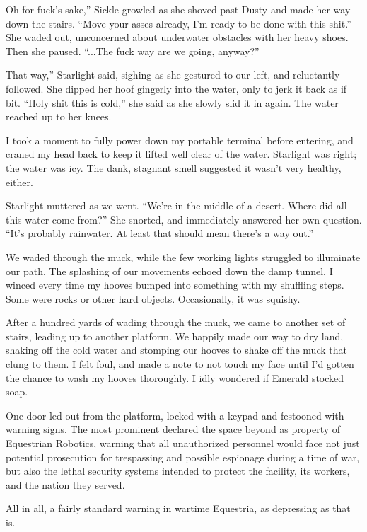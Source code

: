\leavevmode{}Oh for fuck’s sake,” Sickle growled as she shoved past Dusty and made her way down the stairs. “Move your asses already, I’m ready to be done with this shit.” She waded out, unconcerned about underwater obstacles with her heavy shoes. Then she paused. “...The fuck way are we going, anyway?”

\leavevmode{}That way,” Starlight said, sighing as she gestured to our left, and reluctantly followed. She dipped her hoof gingerly into the water, only to jerk it back as if bit. “Holy shit this is cold,” she said as she slowly slid it in again. The water reached up to her knees.

I took a moment to fully power down my portable terminal before entering, and craned my head back to keep it lifted well clear of the water. Starlight was right; the water was icy. The dank, stagnant smell suggested it wasn’t very healthy, either.

Starlight muttered as we went. “We’re in the middle of a desert. Where did all this water come from?” She snorted, and immediately answered her own question. “It’s probably rainwater. At least that should mean there’s a way out.”

We waded through the muck, while the few working lights struggled to illuminate our path. The splashing of our movements echoed down the damp tunnel. I winced every time my hooves bumped into something with my shuffling steps. Some were rocks or other hard objects. Occasionally, it was squishy.

After a hundred yards of wading through the muck, we came to another set of stairs, leading up to another platform. We happily made our way to dry land, shaking off the cold water and stomping our hooves to shake off the muck that clung to them. I felt foul, and made a note to not touch my face until I’d gotten the chance to wash my hooves thoroughly. I idly wondered if Emerald stocked soap.

One door led out from the platform, locked with a keypad and festooned with warning signs. The most prominent declared the space beyond as property of Equestrian Robotics, warning that all unauthorized personnel would face not just potential prosecution for trespassing and possible espionage during a time of war, but also the lethal security systems intended to protect the facility, its workers, and the nation they served.

All in all, a fairly standard warning in wartime Equestria, as depressing as that is.

